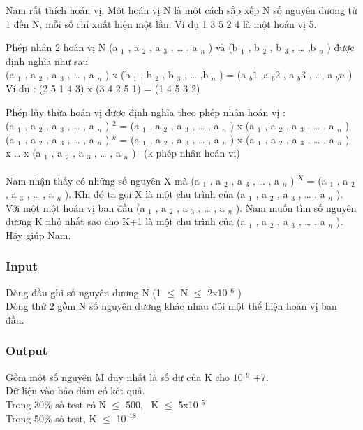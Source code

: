 

Nam rất thích hoán vị. Một hoán vị N là một cách sắp xếp N số nguyên dương từ 1 đến N, mỗi số chỉ xuất hiện một lần. Ví dụ 1 3 5 2 4 là một hoán vị 5.

Phép nhân 2 hoán vị N (a $_ 1 $ , a $_ 2 $ , a $_ 3 $ , … , a $_ n $ ) và (b $_ 1 $ , b $_ 2 $ , b $_ 3 $ , … ,b $_ n $ ) được định nghĩa như sau
\\(a $_ 1 $ , a $_ 2 $ , a $_ 3 $ , … , a $_ n $ ) x (b $_ 1 $ , b $_ 2 $ , b $_ 3 $ , … ,b $_ n $ ) = (a $_ b1 $ ,a $_ b2 $ , a $_ b3 $ , …, a $_ bn $ )
\\Ví dụ : (2 5 1 4 3) x (3 4 2 5 1) = (1 4 5 3 2)

Phép lũy thừa hoán vị được định nghĩa theo phép nhân hoán vị :
\\(a $_ 1 $ , a $_ 2 $ , a $_ 3 $ , … , a $_ n $ ) $^ 2 $ = (a $_ 1 $ , a $_ 2 $ , a $_ 3 $ , … , a $_ n $ ) x (a $_ 1 $ , a $_ 2 $ , a $_ 3 $ , … , a $_ n $ )
\\(a $_ 1 $ , a $_ 2 $ , a $_ 3 $ , … , a $_ n $ ) $^ k $ = (a $_ 1 $ , a $_ 2 $ , a $_ 3 $ , … , a $_ n $ ) x (a $_ 1 $ , a $_ 2 $ , a $_ 3 $ , … , a $_ n $ ) x … x (a $_ 1 $ , a $_ 2 $ , a $_ 3 $ , … , a $_ n $ )  (k phép nhân hoán vị)
\\
\\Nam nhận thấy có những số nguyên X mà (a $_ 1 $ , a $_ 2 $ , a $_ 3 $ , … , a $_ n $ ) $^ X $ = (a $_ 1 $ , a $_ 2 $ , a $_ 3 $ , … , a $_ n $ ). Khi đó ta gọi X là một chu trình của (a $_ 1 $ , a $_ 2 $ , a $_ 3 $ , … , a $_ n $ ).
\\Với một một hoán vị ban đầu (a $_ 1 $ , a $_ 2 $ , a $_ 3 $ , … , a $_ n $ ). Nam muốn tìm số nguyên dương K nhỏ nhất sao cho K+1 là một chu trình của (a $_ 1 $ , a $_ 2 $ , a $_ 3 $ , … , a $_ n $ ). Hãy giúp Nam.

\subsubsection{Input}

Dòng đầu ghi số nguyên dương N (1  $\le$  N  $\le$  2x10 $^ 6 $ )
\\Dòng thứ 2 gồm N số nguyên dương khác nhau đôi một thể hiện hoán vị ban đầu.

\subsubsection{Output}

Gồm một số nguyên M duy nhất là số dư của K cho 10 $^ 9 $ +7.
\\Dữ liệu vào bảo đảm có kết quả.
\\Trong 30\% số test có N  $\le$  500,  K  $\le$  5x10 $^ 5 $
\\Trong 50\% số test, K  $\le$  10 $^ 18 $

